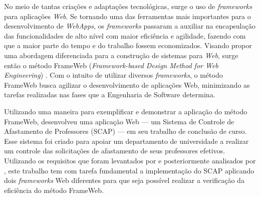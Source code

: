 No meio de tantas criações e adaptações tecnológicas, surge o uso de \textit{frameworks} para aplicações \textit{Web}. Se tornando uma das ferramentas mais importantes para o desenvolvimento de \textit{WebApps}, os \textit{frameworks} passaram a auxiliar na encapsulação das funcionalidades de alto nível com maior eficiência e agilidade, fazendo com que a maior parte do tempo e do trabalho fossem economizados. Visando propor uma abordagem diferenciada para a construção de sistemas para \textit{Web}, surge então o método FrameWeb (\textit{Framework-based Design Method for Web Engineering}) \cite{souza:masterthesis07}. Com o intuito de utilizar diversos \textit{frameworks}, o método FrameWeb busca agilizar o desenvolvimento de aplicações Web, minimizando as tarefas realizadas nas fases que a Engenharia de Software determina.

Utilizando uma maneira para exemplificar e demonstrar a aplicação do método FrameWeb,  desenvolveu uma aplicação Web --- um Sistema de Controle de Afastamento de Professores (SCAP) --- em seu trabalho de conclusão de curso. Esse sistema foi criado para apoiar um departamento de universidade a realizar um controle das solicitações de afastamento de seus professores efetivos. Utilizando os requisitos que foram levantados por  e posteriormente analisados por , este trabalho tem com tarefa fundamental a implementação do SCAP aplicando dois \textit{frameworks} Web diferentes para que seja possível realizar a verificação da eficiência do método FrameWeb.  